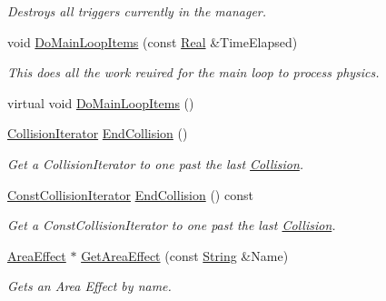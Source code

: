 \begin{DoxyCompactItemize}
\begin{DoxyCompactList}\small\item\em Destroys all triggers currently in the manager. \item\end{DoxyCompactList}\item 
void \hyperlink{classMezzanine_1_1PhysicsManager_a9fffb77acb0644d31ea78de4e823c0a0}{DoMainLoopItems} (const \hyperlink{namespaceMezzanine_a726731b1a7df72bf3583e4a97282c6f6}{Real} \&TimeElapsed)
\begin{DoxyCompactList}\small\item\em This does all the work reuired for the main loop to process physics. \item\end{DoxyCompactList}\item 
virtual void \hyperlink{classMezzanine_1_1PhysicsManager_a21df393f2356a20151fce997577e3d76}{DoMainLoopItems} ()
\item 
\hyperlink{classMezzanine_1_1PhysicsManager_a8d2fa60cdfdc7997a09cb8a3434371af}{CollisionIterator} \hyperlink{classMezzanine_1_1PhysicsManager_a4cf5887ebd7e0f21ee639478ccd5ca65}{EndCollision} ()
\begin{DoxyCompactList}\small\item\em Get a CollisionIterator to one past the last \hyperlink{classMezzanine_1_1Collision}{Collision}. \item\end{DoxyCompactList}\item 
\hyperlink{classMezzanine_1_1PhysicsManager_a667151fe9525d7f3f174ad55a499065f}{ConstCollisionIterator} \hyperlink{classMezzanine_1_1PhysicsManager_aae308444076255406bc67399fb8fca24}{EndCollision} () const 
\begin{DoxyCompactList}\small\item\em Get a ConstCollisionIterator to one past the last \hyperlink{classMezzanine_1_1Collision}{Collision}. \item\end{DoxyCompactList}\item 
\hyperlink{classMezzanine_1_1AreaEffect}{AreaEffect} $\ast$ \hyperlink{classMezzanine_1_1PhysicsManager_a820856e1a0bad25203b86d6e53391f13}{GetAreaEffect} (const \hyperlink{namespaceMezzanine_acf9fcc130e6ebf08e3d8491aebcf1c86}{String} \&Name)
\begin{DoxyCompactList}\small\item\em Gets an Area Effect by name. \item\end{DoxyCompactList}\item 

\end{DoxyCompactItemize}
